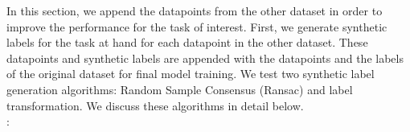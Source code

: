 \documentclass{article}
\begin{document}
In this section, we append the datapoints from the other dataset in order to improve the performance for the task of interest.
First, we generate synthetic labels for the task at hand for each datapoint in the other dataset.
These datapoints and synthetic labels are appended with the datapoints and the labels of the original dataset for final model training.
We test two synthetic label generation algorithms: Random Sample Consensus (Ransac) and label transformation.
We discuss these algorithms in detail below.
\\

:
\end{document}
